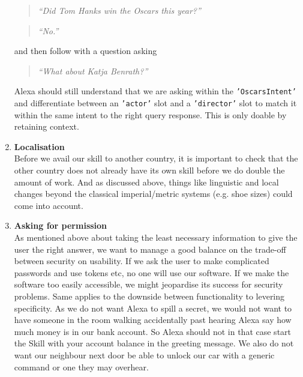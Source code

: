 \begin{enumerate}
 \begin{quotation}
	\textit{	``Did Tom Hanks win the Oscars this year?''}
\end{quotation}

 \begin{quotation}
 	\flushright
	\textit{``No.''}
\end{quotation}


\noindent and then follow with a question asking

 \begin{quotation}
	\textit{	``What about Katja Benrath?''}
\end{quotation}


\noindent Alexa should still understand that we are asking within the \texttt{'OscarsIntent'} and differentiate between an \texttt{'actor'} slot and a \texttt{'director'} slot to match it within the same intent to the right query response.
This is only doable by retaining context.


\item \textbf{Localisation} \\
Before we avail our skill to another country, it is important to check that the other country does not already have its own skill before we do double the amount of work. And as discussed above, things like linguistic and local changes beyond the classical imperial/metric systems (e.g. shoe sizes) could come into account.

\item \textbf{Asking for permission} \\
As mentioned above about taking the least necessary information to give the user the right answer, we want to manage a good balance on the trade-off between security on usability. If we ask the user to make complicated passwords and use tokens etc, no one will use our software. If we make the software too easily accessible, we might jeopardise its success for security problems. Same applies to the downside between functionality to levering specificity. As we do not want Alexa to spill a secret, we would not want to have someone in the room walking accidentally past hearing Alexa say how much money is in our bank account. So Alexa should not in that case start the Skill with your account balance in the greeting message. We also do not want our neighbour next door be able to unlock our car with a generic command or one they may overhear.


\end{enumerate}
